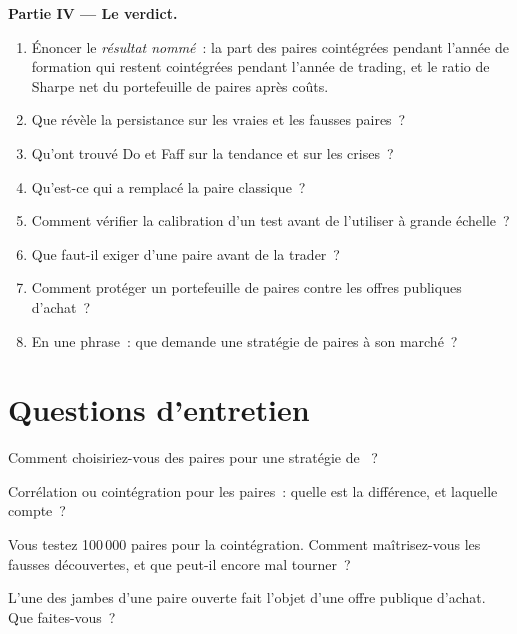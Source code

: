 \begin{problem}
\medskip\noindent\textbf{Partie IV --- Le verdict.}
\begin{enumerate}[resume]
\item Énoncer le \emph{résultat nommé}~: la part des paires cointégrées pendant l'année de formation qui restent cointégrées pendant l'année de trading, et le
ratio de Sharpe net du portefeuille de paires après coûts.
\item Que révèle la persistance sur les vraies et les fausses paires~?
\item Qu'ont trouvé Do et Faff sur la tendance et sur les crises~?
\item Qu'est-ce qui a remplacé la paire classique~?
\item Comment vérifier la calibration d'un test avant de l'utiliser à grande échelle~?
\item Que faut-il exiger d'une paire avant de la trader~?
\item Comment protéger un portefeuille de paires contre les offres publiques d'achat~?
\item En une phrase~: que demande une stratégie de paires à son marché~?
\end{enumerate}
\end{problem}

\section{Questions d'entretien}

\begin{interviewq}\label{iq:s1:pairs-and-baskets:1}
Comment choisiriez-vous des paires pour une stratégie de ~?
\end{interviewq}

\begin{interviewq}\label{iq:s1:pairs-and-baskets:2}
Corrélation ou cointégration pour les paires~: quelle est la différence, et laquelle compte~?
\end{interviewq}

\begin{interviewq}\label{iq:s1:pairs-and-baskets:3}
Vous testez 100\,000 paires pour la cointégration. Comment maîtrisez-vous les fausses découvertes, et que peut-il encore mal tourner~?
\end{interviewq}

\begin{interviewq}\label{iq:s1:pairs-and-baskets:4}
L'une des jambes d'une paire ouverte fait l'objet d'une offre publique d'achat. Que faites-vous~?
\end{interviewq}

